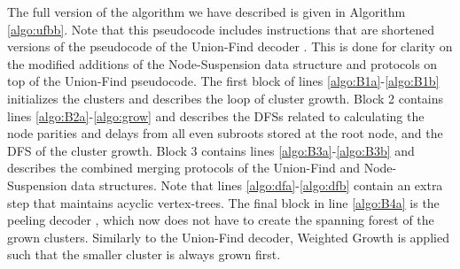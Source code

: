 The full version of the algorithm we have described is given in Algorithm \ref{algo:ufbb}. Note that this pseudocode includes instructions that are shortened versions of the pseudocode of the Union-Find decoder \cite{delfosse2017almost}. This is done for clarity on the modified additions of the Node-Suspension data structure and protocols on top of the Union-Find pseudocode. The first block of lines \ref{algo:B1a}-\ref{algo:B1b} initializes the clusters and describes the loop of cluster growth. Block 2 contains lines \ref{algo:B2a}-\ref{algo:grow} and describes the DFSs related to calculating the node parities and delays from all even subroots stored at the root node, and the DFS of the cluster growth. Block 3 contains lines \ref{algo:B3a}-\ref{algo:B3b} and describes the combined merging protocols of the Union-Find and Node-Suspension data structures. Note that lines \ref{algo:dfa}-\ref{algo:dfb} contain an extra step that maintains acyclic vertex-trees. The final block in line \ref{algo:B4a} is the peeling decoder \cite{delfosse2017linear}, which now does not have to create the spanning forest of the grown clusters. Similarly to the Union-Find decoder, Weighted Growth is applied such that the smaller cluster is always grown first. 
